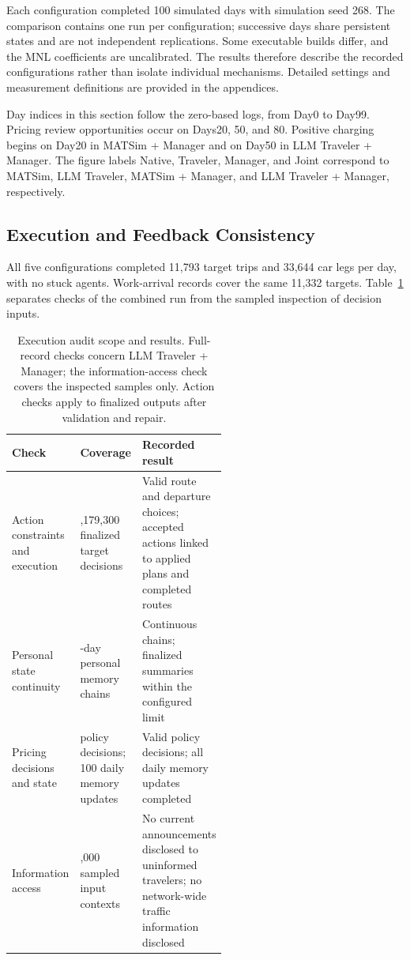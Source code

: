 Each configuration completed 100 simulated days with simulation
seed 268. The comparison contains one run per configuration;
successive days share persistent states and are not independent
replications. Some executable builds differ, and the MNL
coefficients are uncalibrated. The results therefore describe
the recorded configurations rather than isolate individual
mechanisms. Detailed settings and measurement definitions are
provided in the appendices.

Day indices in this section follow the zero-based logs,
from Day0 to Day99. Pricing review opportunities occur on
Days20, 50, and 80. Positive charging begins on Day20 in
MATSim + Manager and on Day50 in LLM Traveler + Manager.
The figure labels Native, Traveler, Manager, and Joint
correspond to MATSim, LLM Traveler, MATSim + Manager,
and LLM Traveler + Manager, respectively.


\subsection{Execution and Feedback Consistency}
\label{sec:validation-execution}

All five configurations completed 11,793 target trips and 33,644 car legs per day, with no stuck agents. Work-arrival records cover the same 11,332 targets. Table~\ref{tab:execution-audit} separates checks of the combined run from the sampled inspection of decision inputs.

\begin{table}[tbp]
\centering\small
\caption{Execution audit scope and results. Full-record checks concern LLM Traveler + Manager; the information-access check covers the inspected samples only. Action checks apply to finalized outputs after validation and repair.}
\label{tab:execution-audit}
\renewcommand{\arraystretch}{1.15}
\begin{tabularx}{\linewidth}{@{}>{\raggedright\arraybackslash}p{0.25\linewidth} >{\raggedright\arraybackslash}p{0.29\linewidth} >{\raggedright\arraybackslash}X@{}}
\toprule
Check & Coverage & Recorded result \\
\midrule
Action constraints and execution & 1,179,300 finalized target decisions & Valid route and departure choices; accepted actions linked to applied plans and completed routes \\
Personal state continuity & 100-day personal memory chains & Continuous chains; finalized summaries within the configured limit \\
Pricing decisions and state & 3 policy decisions; 100 daily memory updates & Valid policy decisions; all daily memory updates completed \\
Information access & 4,000 sampled input contexts & No current announcements disclosed to uninformed travelers; no network-wide traffic information disclosed \\
\bottomrule
\end{tabularx}
\end{table}

